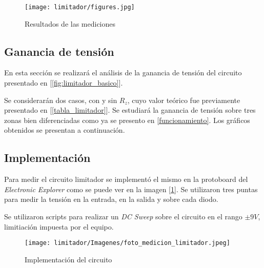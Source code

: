 \begin{figure}[H]
    \begin{center}
        \texttt{[image: limitador/figures.jpg]}
        \caption{Resultados de las mediciones}
    \end{center}
\end{figure}

\subsection{Ganancia de tensión}
En esta sección se realizará el análisis de la ganancia de tensión del circuito 
presentado en [\ref{fig:limitador_basico}]. \par 
Se considerarán dos casos, con y sin $R_z$, cuyo valor teórico fue previamente presentado 
en [\ref{tabla_limitador}].
Se estudiará la ganancia de tensión sobre tres zonas bien diferenciadas como ya se 
presento en \ref{funcionamiento}. Los gráficos obtenidos se presentan a continuación.






\subsection{Implementación}
Para medir el circuito limitador se implementó el mismo en la protoboard del 
\textit{Electronic Explorer} como se puede ver en la imagen [\ref{implementacion_limitador}].
Se utilizaron tres puntas para medir la tensión en la entrada, en la salida y sobre cada 
diodo. \par 
Se utilizaron scripts para realizar un \textit{DC Sweep} sobre el circuito en el rango 
$\pm 9V$, limitiación impuesta por el equipo.


\begin{figure}[H]
    \begin{center}
        \texttt{[image: limitador/Imagenes/foto\_medicion\_limitador.jpeg]}
        \caption{Implementación del circuito}
        \label{implementacion_limitador}
    \end{center}
\end{figure}
